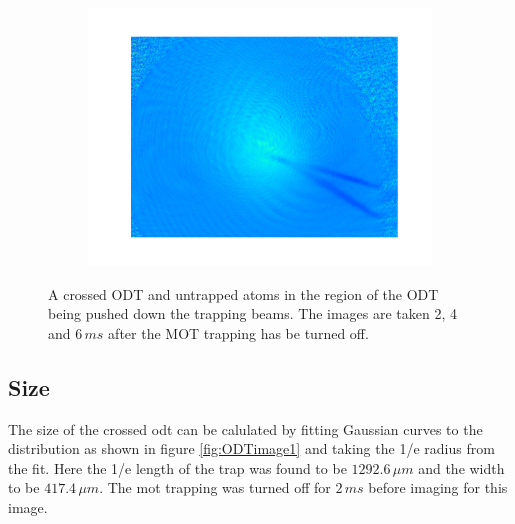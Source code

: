 \begin{figure}[h]
\begin{subfigure}[b]{0.3\textwidth}
        \includegraphics[width=1\textwidth]{figs/ODTimage3.pdf}
    \end{subfigure}
\caption{A crossed ODT and untrapped atoms in the region of the ODT being pushed down the trapping beams. The images are taken 2, 4 and $6\,\unit{ms}$ after the MOT trapping has be turned off.}
\label{fig:crossed_effect}
\end{figure}

\subsection{Size}
The size of the crossed \gls{odt} can be calulated by fitting Gaussian curves to the distribution as shown in figure \ref{fig:ODTimage1} and taking the 1/e radius from the fit. Here the 1/e length of the trap was found to be $1292.6\,\unit{\mu m}$ and the width to be $417.4\,\unit{\mu m}$. The \gls{mot} trapping was turned off for $2\,\unit{ms}$ before imaging for this image.

